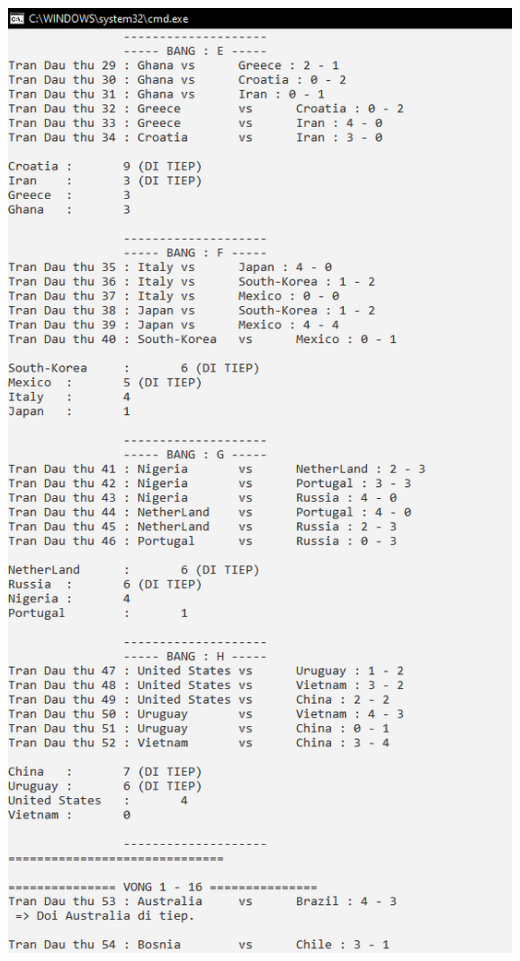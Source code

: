 \documentclass[a4paper]{article}
\begin{document}
\begin{center}
\includegraphics[scale=0.6]{hinh27.png}
\end{center}
\end{document}
